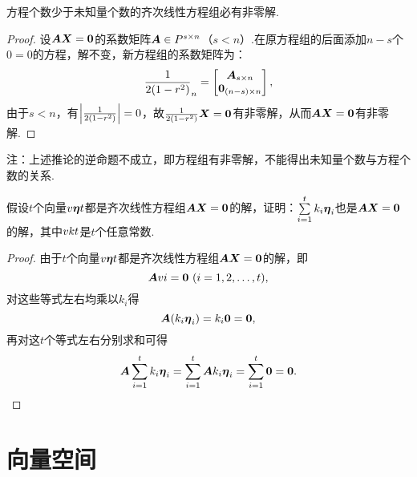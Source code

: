 \begin{corollary}
方程个数少于未知量个数的齐次线性方程组必有非零解.
\begin{proof}
设\(\boldsymbol{A} \boldsymbol{X} = \boldsymbol{0}\)的系数矩阵\(\boldsymbol{A} \in P^{s \times n}\)（\(s < n\)）.在原方程组的后面添加\(n-s\)个\(0=0\)的方程，解不变，新方程组的系数矩阵为：\[
\frac{1}{2(1-r^2)}_{n} = \begin{bmatrix} \boldsymbol{A}_{s \times n} \\ \boldsymbol{0}_{(n-s) \times n} \end{bmatrix},
\]由于\(s < n\)，有\(\abs{\frac{1}{2(1-r^2)}} = 0\)，故\(\frac{1}{2(1-r^2)} \boldsymbol{X} = \boldsymbol{0}\)有非零解，从而\(\boldsymbol{A} \boldsymbol{X} = \boldsymbol{0}\)有非零解.
\end{proof}
\end{corollary}
注：上述推论的逆命题不成立，即方程组有非零解，不能得出未知量个数与方程个数的关系.

\begin{example}
假设\(t\)个向量\(v{\boldsymbol{\eta}}{t}\)都是齐次线性方程组\(\boldsymbol{A} \boldsymbol{X} = \boldsymbol{0}\)的解，证明：\(\sum\limits_{i=1}^t k_i \boldsymbol{\eta}_i\)也是\(\boldsymbol{A} \boldsymbol{X} = \boldsymbol{0}\)的解，其中\(v{k}{t}\)是\(t\)个任意常数.
\begin{proof}
由于\(t\)个向量\(v{\boldsymbol{\eta}}{t}\)都是齐次线性方程组\(\boldsymbol{A} \boldsymbol{X} = \boldsymbol{0}\)的解，即\[
\A \v i = \z\ (i=1,2,\dotsc,t),
\]对这些等式左右均乘以\(k_i\)得\[
\boldsymbol{A} (k_i \boldsymbol{\eta}_i) = k_i \boldsymbol{0} = \boldsymbol{0},
\]再对这\(t\)个等式左右分别求和可得\[
\boldsymbol{A} \sum\limits_{i=1}^t k_i \boldsymbol{\eta}_i = \sum\limits_{i=1}^t \boldsymbol{A} k_i \boldsymbol{\eta}_i = \sum\limits_{i=1}^t \boldsymbol{0} = \boldsymbol{0}.
\qedhere
\]
\end{proof}
\end{example}

\section{向量空间}
